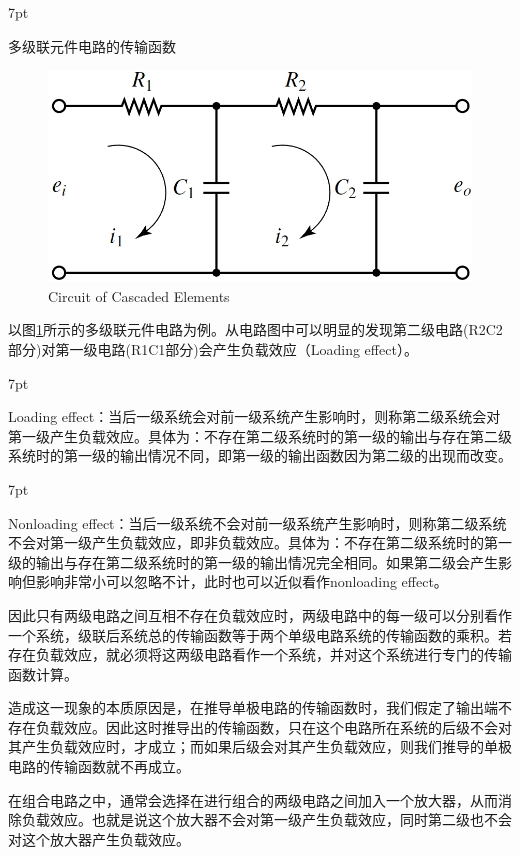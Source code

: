 \documentclass{article}
\numberwithin{equation}{section}
\numberwithin{figure}{section}
\newenvironment{formal}{%
\def\FrameCommand{%
\hspace{1pt}%
{\color{DarkBlue}\vrule width 2pt}%
{\color{formalshade}\vrule width 4pt}%
\colorbox{formalshade}%
}%
\MakeFramed{\advance\hsize-\width\FrameRestore}%
\noindent\hspace{-4.55pt}%
\begin{adjustwidth}{}{7pt}%
\vspace{2pt}\vspace{2pt}%
}
{%
\vspace{2pt}\end{adjustwidth}\endMakeFramed%
}
\begin{document}
\begin{formal}
    多级联元件电路的传输函数
\end{formal}

\begin{figure}
    \centering
    \includegraphics[width=.4\textwidth]{Chapter3/cascadecircuit.png} %
    \caption{Circuit of Cascaded Elements} %
    \label{cascadecircuit} %
\end{figure}

以图\ref{cascadecircuit}所示的多级联元件电路为例。从电路图中可以明显的发现第二级电路(R2C2部分)对第一级电路(R1C1部分)会产生负载效应（Loading effect）。

\begin{formal}
    Loading effect：当后一级系统会对前一级系统产生影响时，则称第二级系统会对第一级产生负载效应。具体为：不存在第二级系统时的第一级的输出与存在第二级系统时的第一级的输出情况不同，即第一级的输出函数因为第二级的出现而改变。
\end{formal}

\begin{formal}
    Nonloading effect：当后一级系统不会对前一级系统产生影响时，则称第二级系统不会对第一级产生负载效应，即非负载效应。具体为：不存在第二级系统时的第一级的输出与存在第二级系统时的第一级的输出情况完全相同。如果第二级会产生影响但影响非常小可以忽略不计，此时也可以近似看作nonloading effect。
\end{formal}

因此只有两级电路之间互相不存在负载效应时，两级电路中的每一级可以分别看作一个系统，级联后系统总的传输函数等于两个单级电路系统的传输函数的乘积。若存在负载效应，就必须将这两级电路看作一个系统，并对这个系统进行专门的传输函数计算。

造成这一现象的本质原因是，在推导单极电路的传输函数时，我们假定了输出端不存在负载效应。因此这时推导出的传输函数，只在这个电路所在系统的后级不会对其产生负载效应时，才成立；而如果后级会对其产生负载效应，则我们推导的单极电路的传输函数就不再成立。

在组合电路之中，通常会选择在进行组合的两级电路之间加入一个放大器，从而消除负载效应。也就是说这个放大器不会对第一级产生负载效应，同时第二级也不会对这个放大器产生负载效应。
\end{document}
